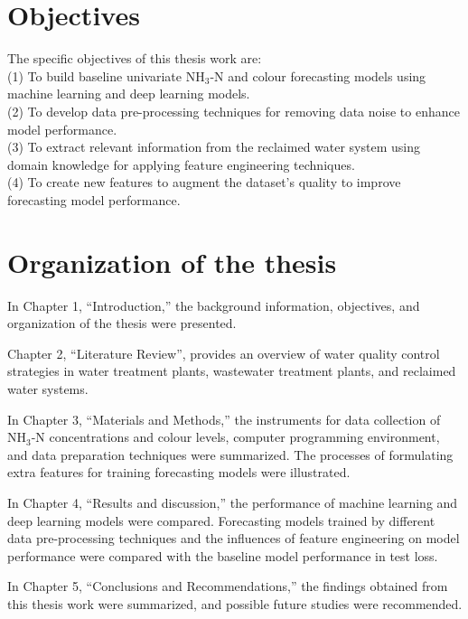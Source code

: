 \section{Objectives}
\noindent
The specific objectives of this thesis work are:\\
(1) To build baseline univariate NH$_{3}$-N and colour forecasting models using machine learning and deep learning models.\\
(2) To develop data pre-processing techniques for removing data noise to enhance model performance.\\
(3) To extract relevant information from the reclaimed water system using domain knowledge for applying feature engineering techniques.\\
(4) To create new features to augment the dataset's quality to improve forecasting model performance.

\section{Organization of the thesis}
In Chapter 1, “Introduction,” the background information, objectives, and organization of the thesis were presented.

Chapter 2, “Literature Review”, provides an overview of water quality control strategies in water treatment plants, wastewater treatment plants, and reclaimed water systems.

In Chapter 3, “Materials and Methods,” the instruments for data collection of NH$_{3}$-N concentrations and colour levels, computer programming environment, and data preparation techniques were summarized. The processes of formulating extra features for training forecasting models were illustrated.

In Chapter 4, “Results and discussion,” the performance of machine learning and deep learning models were compared. Forecasting models trained by different data pre-processing techniques and the influences of feature engineering on model performance were compared with the baseline model performance in test loss. 

In Chapter 5, “Conclusions and Recommendations,” the findings obtained from this thesis work were summarized, and possible future studies were recommended.